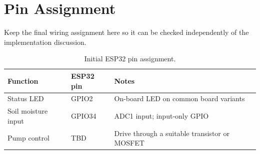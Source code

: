 \chapter{Pin Assignment}
\label{app:pinout}

Keep the final wiring assignment here so it can be checked independently of the
implementation discussion.

\begin{table}[htbp]
  \centering
  \caption{Initial ESP32 pin assignment.}
  \label{tab:pin-assignment}
  \begin{tabular}{lll}
    \toprule
    Function & ESP32 pin & Notes \\
    \midrule
    Status LED & GPIO2 & On-board LED on common board variants \\
    Soil moisture input & GPIO34 & ADC1 input; input-only GPIO \\
    Pump control & TBD & Drive through a suitable transistor or MOSFET \\
    \bottomrule
  \end{tabular}
\end{table}
